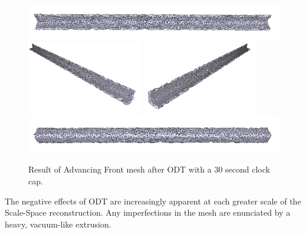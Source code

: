 \documentclass[12pt]{drexelthesis}
\begin{document}
\begin{figure}[!ht]
	\centering
		\includegraphics[width=5in]{simulated-lab-scan/0noise/optimizedNeat/advancingfrontodt00.png}
		\includegraphics[width=2in]{simulated-lab-scan/0noise/optimizedNeat/advancingfrontodt01.png}
		\includegraphics[width=2in]{simulated-lab-scan/0noise/optimizedNeat/advancingfrontodt02.png}
		\includegraphics[width=5in]{simulated-lab-scan/0noise/optimizedNeat/advancingfrontodt03.png}
		\caption[Advancing Front mesh after ODT with a 30 second clock cap]{\centering  Result of Advancing Front mesh after ODT with a 30 second clock cap.}
	\label{zeronoise:advancedodt}
\end{figure}

The negative effects of ODT are increasingly apparent at each greater scale of the Scale-Space reconstruction. Any imperfections in the mesh are enunciated by a heavy, vacuum-like extrusion.
\end{document}
